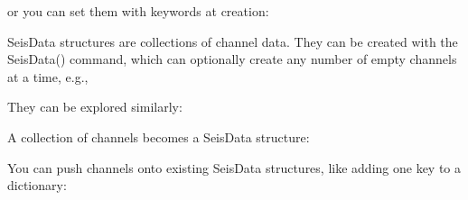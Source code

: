 \documentclass[letterpaper,11pt,english]{sphinxmanual}
\begin{document}
\begin{sphinxVerbatim}[commandchars=\\\{\}]
  \PYG{p}{[}    \PYG{p}{]}
  
\end{sphinxVerbatim}

or you can set them with keywords at creation:

\begin{sphinxVerbatim}[commandchars=\\\{\}]
  
\end{sphinxVerbatim}

SeisData structures are collections of channel data. They can be created with
the SeisData() command, which can optionally create any number of empty channels
at a time, e.g.,


\begin{fulllineitems}
\end{fulllineitems}


They can be explored similarly:

\begin{sphinxVerbatim}[commandchars=\\\{\}]
\PYG{p}{[}\PYG{p}{]}  
\PYG{p}{[}\PYG{p}{]}  \PYG{p}{[}    \PYG{p}{]}
\end{sphinxVerbatim}

A collection of channels becomes a SeisData structure:


\begin{fulllineitems}
\end{fulllineitems}


You can push channels onto existing SeisData structures, like adding one key
to a dictionary:
\end{document}
